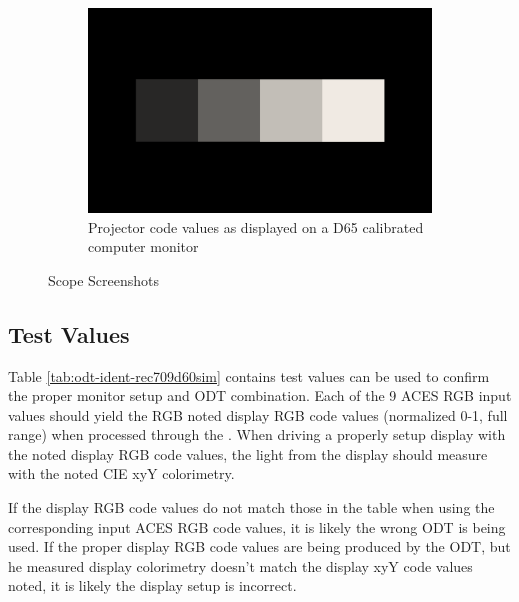 \begin{figure}[ht!]
\begin{subfigure}[b]{0.475\textwidth}
            \includegraphics[width=\textwidth]{images/rec709_d60sim/rec709_d60sim_image}
            \caption[Projector code values as displayed on a D65 calibrated computer monitor]%
            {{\small Projector code values as displayed on a D65 calibrated computer monitor}}    
            \label{fig:cv-rec709_d60sim}
        \end{subfigure}
        \caption[]
        {\small \texttt{} Scope Screenshots} 
        \label{fig:screenshots-rec709_d60sim}
    \end{figure}


\subsection{Test Values}
\label{subsec:testValues-rec709d60sim}

Table \ref{tab:odt-ident-rec709d60sim} contains test values can be used to confirm the proper monitor setup and ODT combination.  Each of the 9 ACES RGB input values should yield the RGB noted display RGB code values (normalized 0-1, full range) when processed through the \texttt{}. When driving a properly setup display with the noted display RGB code values, the light from the display should measure with the noted CIE xyY colorimetry.  

If the display RGB code values do not match those in the table when using the corresponding input ACES RGB code values, it is likely the wrong ODT is being used.  If the proper display RGB code values are being produced by the ODT, but he measured display colorimetry doesn't match the display xyY code values noted, it is likely the display setup is incorrect.

